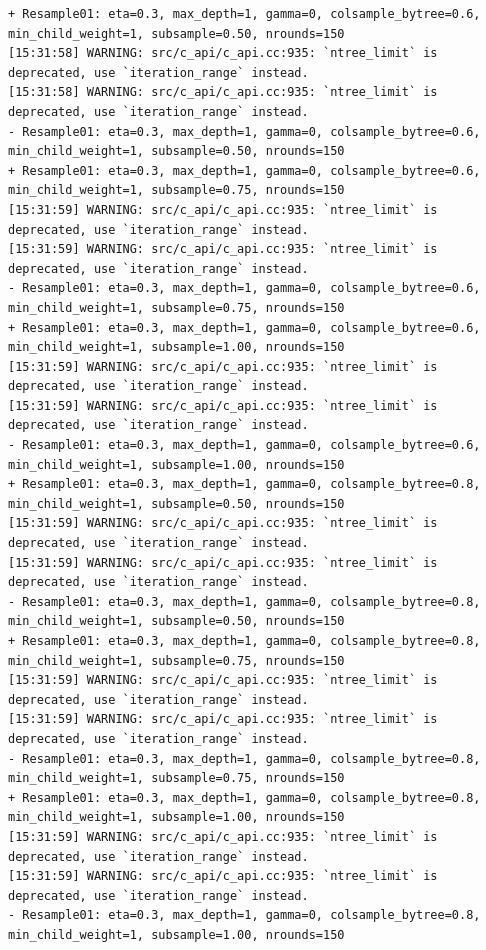 \documentclass[
  letterpaper,
  DIV=11,
  numbers=noendperiod]{scrartcl}
\begin{document}
\begin{verbatim}
+ Resample01: eta=0.3, max_depth=1, gamma=0, colsample_bytree=0.6, min_child_weight=1, subsample=0.50, nrounds=150 
[15:31:58] WARNING: src/c_api/c_api.cc:935: `ntree_limit` is deprecated, use `iteration_range` instead.
[15:31:58] WARNING: src/c_api/c_api.cc:935: `ntree_limit` is deprecated, use `iteration_range` instead.
- Resample01: eta=0.3, max_depth=1, gamma=0, colsample_bytree=0.6, min_child_weight=1, subsample=0.50, nrounds=150 
+ Resample01: eta=0.3, max_depth=1, gamma=0, colsample_bytree=0.6, min_child_weight=1, subsample=0.75, nrounds=150 
[15:31:59] WARNING: src/c_api/c_api.cc:935: `ntree_limit` is deprecated, use `iteration_range` instead.
[15:31:59] WARNING: src/c_api/c_api.cc:935: `ntree_limit` is deprecated, use `iteration_range` instead.
- Resample01: eta=0.3, max_depth=1, gamma=0, colsample_bytree=0.6, min_child_weight=1, subsample=0.75, nrounds=150 
+ Resample01: eta=0.3, max_depth=1, gamma=0, colsample_bytree=0.6, min_child_weight=1, subsample=1.00, nrounds=150 
[15:31:59] WARNING: src/c_api/c_api.cc:935: `ntree_limit` is deprecated, use `iteration_range` instead.
[15:31:59] WARNING: src/c_api/c_api.cc:935: `ntree_limit` is deprecated, use `iteration_range` instead.
- Resample01: eta=0.3, max_depth=1, gamma=0, colsample_bytree=0.6, min_child_weight=1, subsample=1.00, nrounds=150 
+ Resample01: eta=0.3, max_depth=1, gamma=0, colsample_bytree=0.8, min_child_weight=1, subsample=0.50, nrounds=150 
[15:31:59] WARNING: src/c_api/c_api.cc:935: `ntree_limit` is deprecated, use `iteration_range` instead.
[15:31:59] WARNING: src/c_api/c_api.cc:935: `ntree_limit` is deprecated, use `iteration_range` instead.
- Resample01: eta=0.3, max_depth=1, gamma=0, colsample_bytree=0.8, min_child_weight=1, subsample=0.50, nrounds=150 
+ Resample01: eta=0.3, max_depth=1, gamma=0, colsample_bytree=0.8, min_child_weight=1, subsample=0.75, nrounds=150 
[15:31:59] WARNING: src/c_api/c_api.cc:935: `ntree_limit` is deprecated, use `iteration_range` instead.
[15:31:59] WARNING: src/c_api/c_api.cc:935: `ntree_limit` is deprecated, use `iteration_range` instead.
- Resample01: eta=0.3, max_depth=1, gamma=0, colsample_bytree=0.8, min_child_weight=1, subsample=0.75, nrounds=150 
+ Resample01: eta=0.3, max_depth=1, gamma=0, colsample_bytree=0.8, min_child_weight=1, subsample=1.00, nrounds=150 
[15:31:59] WARNING: src/c_api/c_api.cc:935: `ntree_limit` is deprecated, use `iteration_range` instead.
[15:31:59] WARNING: src/c_api/c_api.cc:935: `ntree_limit` is deprecated, use `iteration_range` instead.
- Resample01: eta=0.3, max_depth=1, gamma=0, colsample_bytree=0.8, min_child_weight=1, subsample=1.00, nrounds=150 

\end{verbatim}
\end{document}
